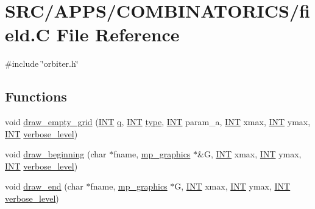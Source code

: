 \hypertarget{field_8_c}{}\section{S\+R\+C/\+A\+P\+P\+S/\+C\+O\+M\+B\+I\+N\+A\+T\+O\+R\+I\+C\+S/field.C File Reference}
\label{field_8_c}
{\ttfamily \#include \char`\"{}orbiter.\+h\char`\"{}}\newline
\subsection*{Functions}
\begin{DoxyCompactItemize}
\item 
void \mbox{\hyperlink{field_8_c_a0d28d1958c704e954ef7bb377a58c811}{draw\+\_\+empty\+\_\+grid}} (\mbox{\hyperlink{galois_8h_a09fddde158a3a20bd2dcadb609de11dc}{I\+NT}} \mbox{\hyperlink{simeon_8_c_a92cbb483a3b27ae1a0dbfcb125ce216f}{q}}, \mbox{\hyperlink{galois_8h_a09fddde158a3a20bd2dcadb609de11dc}{I\+NT}} \mbox{\hyperlink{_l_i_b_2_g_a_l_o_i_s_2dlx_8_c_ad241c8005abf9f323e9fffec67f55abf}{type}}, \mbox{\hyperlink{galois_8h_a09fddde158a3a20bd2dcadb609de11dc}{I\+NT}} param\+\_\+a, \mbox{\hyperlink{galois_8h_a09fddde158a3a20bd2dcadb609de11dc}{I\+NT}} xmax, \mbox{\hyperlink{galois_8h_a09fddde158a3a20bd2dcadb609de11dc}{I\+NT}} ymax, \mbox{\hyperlink{galois_8h_a09fddde158a3a20bd2dcadb609de11dc}{I\+NT}} \mbox{\hyperlink{simeon_8_c_a818073fbcc2f439e7c56952f67386122}{verbose\+\_\+level}})
\item 
void \mbox{\hyperlink{field_8_c_acc89357b4d9e622a5351e636fb9909ae}{draw\+\_\+beginning}} (char $\ast$fname, \mbox{\hyperlink{classmp__graphics}{mp\+\_\+graphics}} $\ast$\&G, \mbox{\hyperlink{galois_8h_a09fddde158a3a20bd2dcadb609de11dc}{I\+NT}} xmax, \mbox{\hyperlink{galois_8h_a09fddde158a3a20bd2dcadb609de11dc}{I\+NT}} ymax, \mbox{\hyperlink{galois_8h_a09fddde158a3a20bd2dcadb609de11dc}{I\+NT}} \mbox{\hyperlink{simeon_8_c_a818073fbcc2f439e7c56952f67386122}{verbose\+\_\+level}})
\item 
void \mbox{\hyperlink{field_8_c_aa7a3dc8d6361a7ba3753a74bdc72b44a}{draw\+\_\+end}} (char $\ast$fname, \mbox{\hyperlink{classmp__graphics}{mp\+\_\+graphics}} $\ast$G, \mbox{\hyperlink{galois_8h_a09fddde158a3a20bd2dcadb609de11dc}{I\+NT}} xmax, \mbox{\hyperlink{galois_8h_a09fddde158a3a20bd2dcadb609de11dc}{I\+NT}} ymax, \mbox{\hyperlink{galois_8h_a09fddde158a3a20bd2dcadb609de11dc}{I\+NT}} \mbox{\hyperlink{simeon_8_c_a818073fbcc2f439e7c56952f67386122}{verbose\+\_\+level}})

\end{DoxyCompactItemize}

